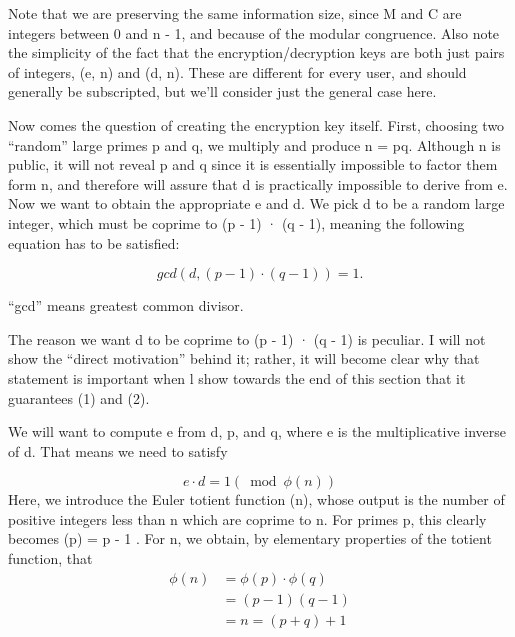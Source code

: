 \documentclass{article}
\begin{document}
Note that we are preserving the same information size, since M and C are integers between 0 and n - 1, and because of the modular congruence. Also note the simplicity of the fact that the encryption/decryption keys are both just pairs of integers, (e, n) and (d, n). These are different for every user, and should generally be subscripted, but we’ll consider just the general case here. 
\\\par\setlength\parindent{2em}

Now comes the question of creating the encryption key itself. First, choosing two “random” large primes p and q, we multiply and produce n = pq. Although n is public, it will not reveal p and q since it is essentially impossible to factor them form n, and therefore will assure that d is practically impossible to derive from e. 
Now we want to obtain the appropriate e and d. We pick d to be a random large integer, which must be coprime to (p - 1) · (q - 1), meaning the following equation has to be satisfied:

\begin{equation}
gcd(d,(p-1)·(q-1))=1.
\end{equation}

“gcd” means greatest common divisor. 
\\\par\setlength\parindent{2em}

The reason we want d to be coprime to (p - 1) · (q - 1) is peculiar. I will not show the “direct motivation” behind it; rather, it will become clear why that statement is important when l show towards the end of this section that it guarantees (1) and (2). 
\\\par\setlength\parindent{2em}

We will want to compute e from d, p, and q, where e is the multiplicative inverse of d. That means we need to satisfy
\\\par\setlength\parindent{2em}

\begin{equation}
e·d = 1(\bmod\phi(n))
\end{equation}
Here, we introduce the Euler totient function (n), whose output is the number of positive integers less than n which are coprime to n. For primes p, this clearly becomes (p) = p - 1 . For n, we obtain, by elementary properties of the totient function, that
\begin{equation}
\begin{split}
\phi(n)& =\phi(p)·\phi(q)\\
& =(p-1)(q-1)\\
& =n=(p+q)+1
\end{split}
\end{equation}
\end{document}

